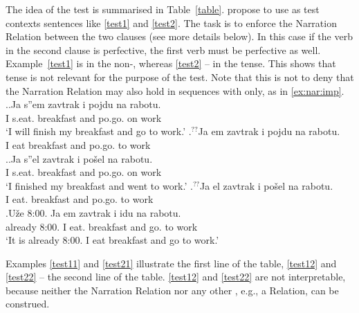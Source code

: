 The idea of the test is summarised in Table~\ref{table}. \citet{ZinovaFilip:13} propose to use as test contexts sentences like \ref{test1} and \ref{test2}. The task is to enforce the Narration Relation  between the two clauses (see more details below). In this case if the verb in the second clause is perfective, the first verb must be perfective as well. Example~\ref{test1} is in the non-, whereas \ref{test2} -- in the  tense. This shows that tense is not relevant for the purpose of the test. Note that this is not to deny that the Narration Relation may also hold in sequences with  only, as in \ref{ex:nar:imp}.
\ex.\label{test1}\ag.\label{test11}Ja s''em\textsuperscript{\PF} zavtrak i pojdu\textsuperscript{\PF} na rabotu.\\
I s.eat. breakfast and po.go. on work\\
\trans `I will finish my breakfast and go to work.'
\bg.\label{test12}$^{??}$Ja em\textsuperscript{\IPF} zavtrak i pojdu\textsuperscript{\PF} na rabotu.\\ 
I eat breakfast and po.go. to work\\

\ex.\label{test2}\ag.\label{test21}Ja s''el\textsuperscript{\PF} zavtrak i po\v{s}el\textsuperscript{\PF} na rabotu.\\
I s.eat. breakfast and po.go. on work\\
\trans `I finished my breakfast and went to work.'
\bg.\label{test22}$^{??}$Ja el\textsuperscript{\IPF} zavtrak i po\v{s}el\textsuperscript{\PF} na rabotu.\\
I eat. breakfast and po.go. to work\\

\exg.\label{ex:nar:imp}U\v{z}e 8:00. Ja em\textsuperscript{\IPF} zavtrak i idu\textsuperscript{\IPF} na rabotu.\\
already 8:00. I eat. breakfast and go. to work\\
\trans `It is already 8:00. I eat breakfast and go to work.'

Examples \ref{test11} and \ref{test21} illustrate the first line of the table, \ref{test12} and \ref{test22} -- the second line of the table. \ref{test12} and \ref{test22} are not interpretable, because neither the Narration Relation nor any other , e.g., a  Relation, can be construed. 

